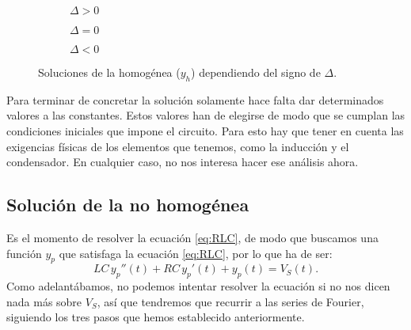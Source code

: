 \begin{figure}
\begin{figurebox}
    \vspace{10pt}
    \centering
      \begin{subfigure}{.3\textwidth}
          \centering
          \scalebox{0.25}{ }
          \caption{$\Delta>0$}
          \label{fig:0a} 
      \end{subfigure} %
      \begin{subfigure}{.3\textwidth}
          \centering
          \scalebox{0.25}{}
          \caption{$\Delta=0$}
          \label{fig:0b}
      \end{subfigure} %
      \begin{subfigure}{.3\textwidth}
          \centering
          \scalebox{0.25}{}
          \caption{$\Delta<0$}
          \label{fig:0c}
      \end{subfigure}
      \caption{Soluciones de la homogénea ($y_h$) dependiendo del signo de $\Delta$.}
      \label{fig:SolucionesHomogenea}
    
\end{figurebox}
\end{figure}

Para terminar de concretar la solución solamente hace falta dar determinados valores a las constantes. Estos valores han de elegirse de modo que se cumplan las condiciones iniciales que impone el circuito. Para esto hay que tener en cuenta las exigencias físicas de los elementos que tenemos, como la inducción y el condensador. En cualquier caso, no nos interesa hacer ese análisis ahora.


\subsection{Solución de la no homogénea} 
Es el momento de resolver la ecuación \eqref{eq:RLC}, de modo que buscamos una función $y_p$ que satisfaga la ecuación \eqref{eq:RLC}, por lo que ha de ser:
\[
LC \,y_p '' (t) + RC\, y_p'(t) + y_p(t) = V_S(t).
\]
Como adelantábamos, no podemos intentar resolver la ecuación si no nos dicen nada más sobre $V_S$, así que tendremos que recurrir a las series de Fourier, siguiendo los tres pasos que hemos establecido anteriormente.

